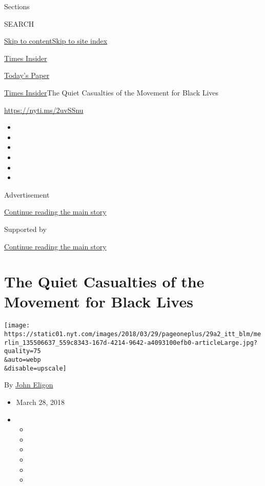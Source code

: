Sections

SEARCH

\protect\hyperlink{site-content}{Skip to
content}\protect\hyperlink{site-index}{Skip to site index}

\href{https://www.nytimes.com/section/reader-center}{Times Insider}

\href{https://myaccount.nytimes.com/auth/login?response_type=cookie\&client_id=vi}{}

\href{https://www.nytimes.com/section/todayspaper}{Today's Paper}

\href{/section/reader-center}{Times Insider}\textbar{}The Quiet
Casualties of the Movement for Black Lives

\href{https://nyti.ms/2uvSSnu}{https://nyti.ms/2uvSSnu}

\begin{itemize}
\item
\item
\item
\item
\item
\item
\end{itemize}

Advertisement

\protect\hyperlink{after-top}{Continue reading the main story}

Supported by

\protect\hyperlink{after-sponsor}{Continue reading the main story}

\hypertarget{the-quiet-casualties-of-the-movement-for-black-lives}{%
\section{The Quiet Casualties of the Movement for Black
Lives}\label{the-quiet-casualties-of-the-movement-for-black-lives}}

\texttt{[image: https://static01.nyt.com/images/2018/03/29/pageoneplus/29a2\_itt\_blm/merlin\_135506637\_559c8343-167d-4214-9642-a4093100efb0-articleLarge.jpg?quality=75\\\&auto=webp\\\&disable=upscale]}

By \href{http://www.nytimes.com/by/john-eligon}{John Eligon}

\begin{itemize}
\item
  March 28, 2018
\item
  \begin{itemize}
  \item
  \item
  \item
  \item
  \item
  \item
  \end{itemize}
\end{itemize}

